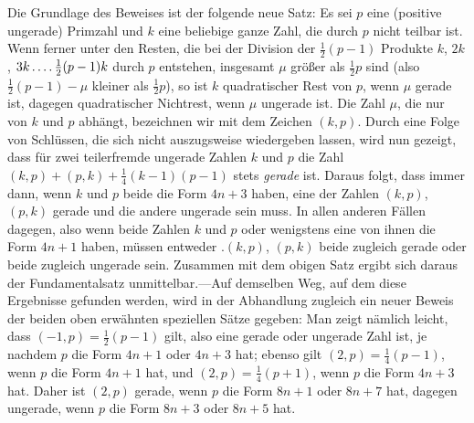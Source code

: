 Die Grundlage des Beweises ist der folgende neue Satz: Es sei $p$ eine (positive ungerade) Primzahl und $k$ eine beliebige ganze Zahl, die durch $p$ nicht teilbar ist. Wenn ferner unter den Resten, die bei der Division der $\frac12(p-1)$ Produkte $k$, $2k$, $3k\mathinner{.\,.\,.\,.}\frac12(p-1)k$ durch $p$ entstehen, insgesamt $\mu$ größer als $\frac12p$ sind (also $\frac12(p-1)-\mu$ kleiner als $\frac12p$), so ist $k$ quadratischer Rest von $p$, wenn $\mu$ gerade ist, dagegen quadratischer Nichtrest, wenn $\mu$ ungerade ist. Die Zahl $\mu$, die nur von $k$
%
und $p$ abhängt, bezeichnen wir mit dem Zeichen $(k,p)$. Durch eine Folge von Schlüssen, die sich nicht auszugsweise wiedergeben lassen, wird nun gezeigt, dass für zwei teilerfremde ungerade Zahlen $k$ und $p$ die Zahl $(k,p)+(p,k)+\frac14(k-1)(p-1)$ stets \emph{gerade} ist. Daraus folgt, dass immer dann, wenn $k$ und $p$ beide die Form $4n+3$ haben, eine der Zahlen $(k,p)$, $(p,k)$ gerade und die andere ungerade sein muss. In allen anderen Fällen dagegen, also wenn beide Zahlen $k$ und $p$ oder wenigstens eine von ihnen die Form $4n+1$ haben, müssen entweder .$(k,p)$, $(p,k)$ beide zugleich gerade oder beide zugleich ungerade sein. Zusammen mit dem obigen Satz ergibt sich daraus der Fundamentalsatz unmittelbar.---Auf demselben Weg, auf dem diese Ergebnisse gefunden werden, wird in der Abhandlung zugleich ein neuer Beweis der beiden oben erwähnten speziellen Sätze gegeben: Man zeigt nämlich leicht, dass $(-1,p)=\frac12(p-1)$ gilt, also eine gerade oder ungerade Zahl ist, je nachdem $p$ die Form $4n+1$ oder $4n+3$ hat; ebenso gilt $(2,p)=\frac14(p-1)$, wenn $p$ die Form $4n+1$ hat, und $(2,p)=\frac14(p+1)$, wenn $p$ die Form $4n+3$ hat. Daher ist $(2,p)$ gerade, wenn $p$ die Form $8n+1$ oder $8n+7$ hat, dagegen ungerade, wenn $p$ die Form $8n+3$ oder $8n+5$ hat.
